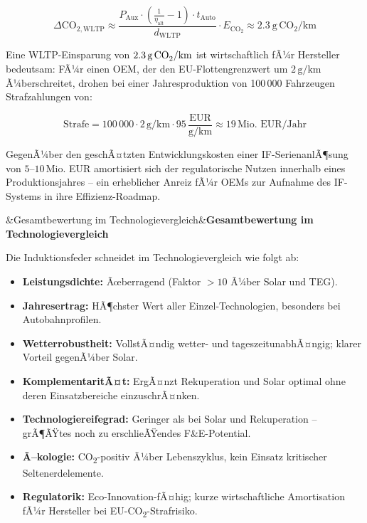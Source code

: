 ﻿\documentclass[12pt, a4paper]{report}
\newenvironment{ergebnis}[1][]{%
  \begin{ergebnisframe}\sloppy%
  \ifx&#1&\else\textbf{#1}\par\smallskip\fi}{\end{ergebnisframe}}
\theoremstyle{definition}
\theoremstyle{remark}
\begin{document}
\begin{equation}
  \Delta \text{CO}_{2,\text{WLTP}} \approx
  \frac{P_{\text{Aux}} \cdot \left(\frac{1}{\eta_{\text{alt}}} - 1\right) \cdot t_{\text{Auto}}}{d_{\text{WLTP}}}
  \cdot E_{\text{CO}_2}
  \approx \SI{2.3}{\gram\,\text{CO}_2\per\kilo\metre}
  \label{eq:co2_wltp}
\end{equation}

Eine WLTP-Einsparung von $2.3\,\text{g\,CO}_2/\text{km}$ ist wirtschaftlich
fÃ¼r Hersteller bedeutsam: FÃ¼r einen OEM, der den EU-Flottengrenzwert um
$2\,\text{g/km}$ Ã¼berschreitet, drohen bei einer Jahresproduktion von
100\,000 Fahrzeugen Strafzahlungen von:

\begin{equation}
  \text{Strafe} = 100\,000 \cdot 2\,\text{g/km} \cdot 95\,\frac{\text{EUR}}{\text{g/km}}
  \approx 19\,\text{Mio.~EUR/Jahr}
  \label{eq:strafe_eu}
\end{equation}

GegenÃ¼ber den geschÃ¤tzten Entwicklungskosten einer IF-SerienanlÃ¶sung von
$5$--$10\,\text{Mio.}$ EUR amortisiert sich der regulatorische Nutzen
innerhalb eines Produktionsjahres -- ein erheblicher Anreiz fÃ¼r OEMs zur
Aufnahme des IF-Systems in ihre Effizienz-Roadmap.

\begin{ergebnis}[Gesamtbewertung im Technologievergleich]
  Die Induktionsfeder schneidet im Technologievergleich wie folgt ab:
  \begin{itemize}
    \item \textbf{Leistungsdichte:} Ãœberragend (Faktor $> 10$ Ã¼ber Solar und TEG).
    \item \textbf{Jahresertrag:} HÃ¶chster Wert aller Einzel-Technologien, besonders
          bei Autobahnprofilen.
    \item \textbf{Wetterrobustheit:} VollstÃ¤ndig wetter- und tageszeitunabhÃ¤ngig;
          klarer Vorteil gegenÃ¼ber Solar.
    \item \textbf{KomplementaritÃ¤t:} ErgÃ¤nzt Rekuperation und Solar optimal
          ohne deren Einsatzbereiche einzuschrÃ¤nken.
    \item \textbf{Technologiereifegrad:} Geringer als bei Solar und Rekuperation
          -- grÃ¶ÃŸtes noch zu erschlieÃŸendes F\&E-Potential.
    \item \textbf{Ã–kologie:} CO\textsubscript{2}-positiv Ã¼ber Lebenszyklus,
          kein Einsatz kritischer Seltenerdelemente.
    \item \textbf{Regulatorik:} Eco-Innovation-fÃ¤hig; kurze wirtschaftliche
          Amortisation fÃ¼r Hersteller bei EU-CO\textsubscript{2}-Strafrisiko.
  \end{itemize}
\end{ergebnis}
\end{document}
